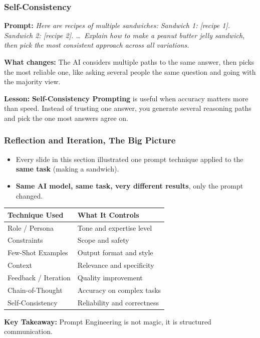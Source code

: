 \begin{frame}[fragile]\frametitle{Self-Consistency}

\textbf{Prompt:} \emph{Here are recipes of multiple sandwiches: Sandwich 1: [recipe 1]. Sandwich 2: [recipe 2]. \ldots\ Explain how to make a peanut butter jelly sandwich, then pick the most consistent approach across all variations.}

\medskip
\textbf{What changes:} The AI considers multiple paths to the same answer, then picks the most reliable one, like asking several people the same question and going with the majority view.

\medskip
\textbf{Lesson:} \textbf{Self-Consistency Prompting} is useful when accuracy matters more than speed. Instead of trusting one answer, you generate several reasoning paths and pick the one most answers agree on.

\end{frame}

\begin{frame}[fragile]\frametitle{Reflection and Iteration, The Big Picture}

\begin{itemize}
\item Every slide in this section illustrated one prompt technique applied to the \textbf{same task} (making a sandwich).
\item \textbf{Same AI model, same task, very different results}, only the prompt changed.
\end{itemize}

\medskip
\begin{center}
\renewcommand{\arraystretch}{1.3}
\begin{tabular}{|l|l|}
\hline
\textbf{Technique Used} & \textbf{What It Controls} \\
\hline
Role / Persona & Tone and expertise level \\
Constraints & Scope and safety \\
Few-Shot Examples & Output format and style \\
Context & Relevance and specificity \\
Feedback / Iteration & Quality improvement \\
Chain-of-Thought & Accuracy on complex tasks \\
Self-Consistency & Reliability and correctness \\
\hline
\end{tabular}
\end{center}

\medskip
\textbf{Key Takeaway:} Prompt Engineering is not magic, it is structured communication.

\end{frame}
